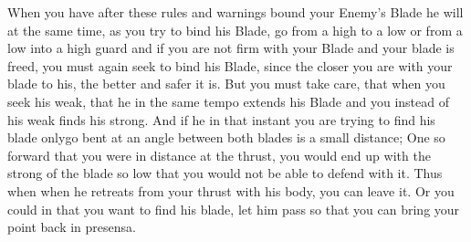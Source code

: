 When you have after these rules and warnings bound your Enemy's Blade
he will at the same time, as you try to bind his Blade, go from a high
to a low or from a low into a high guard and if you are not firm with
your Blade and your blade is freed, you must again seek to bind his
Blade, since the closer you are with your blade to his, the better and
safer it is. But you must take care, that when you seek his weak, that
he in the same tempo extends his Blade and you instead of his weak
finds his strong. And if he in that instant you are trying to find his
blade onlygo bent at an angle between both blades is a
small distance; One so forward that you were in distance at the
thrust, you would end up with the strong of the blade so low that you
would not be able to defend with it. Thus when when he retreats from
your thrust with his body, you can leave it. Or you could in that you
want to find his blade, let him pass so that you can bring your point
back in presensa.


